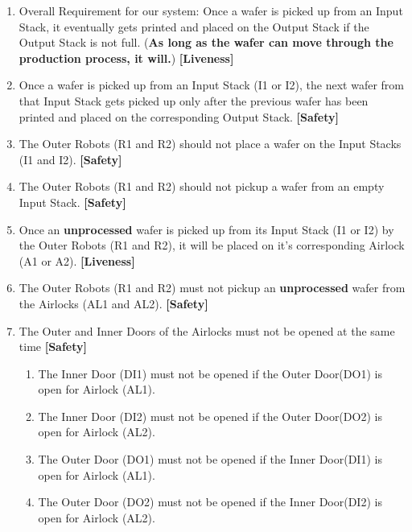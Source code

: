 \documentclass[a4paper,12pt]{article}
\begin{document}
	\begin{enumerate}
		\item Overall Requirement for our system: Once a wafer is picked up from an Input Stack, it eventually gets printed and placed on the Output Stack if the Output Stack is not full. (\textbf{As long as the wafer can move through the production process, it will.}) \textbf{[Liveness]}
		\item Once a wafer is picked up from an Input Stack (I1 or I2), the next wafer from that Input Stack gets picked up only after the previous wafer has been printed and placed on the corresponding Output Stack. \textbf{[Safety]}
		\item The Outer Robots (R1 and R2) should not place a wafer on the Input Stacks (I1 and I2). \textbf{[Safety]}
		\item The Outer Robots (R1 and R2) should not pickup a wafer from an empty Input Stack. \textbf{[Safety]}
		\item Once an \textbf{unprocessed} wafer is picked up from its Input Stack (I1 or I2) by the Outer Robots (R1 and R2), it will be placed on it's corresponding Airlock (A1 or A2). \textbf{[Liveness]}
		\item The Outer Robots (R1 and R2) must not pickup an \textbf{unprocessed} wafer from the Airlocks (AL1 and AL2). \textbf{[Safety]}
		\item The Outer and Inner Doors of the Airlocks must not be opened at the same time \textbf{[Safety]}
		\begin{enumerate}
			\item The Inner Door (DI1) must not be opened if the Outer Door(DO1) is open for Airlock (AL1).
			
			\item The Inner Door (DI2) must not be opened if the Outer Door(DO2) is open for Airlock (AL2).
			
			\item The Outer Door (DO1) must not be opened if the Inner Door(DI1) is open for Airlock (AL1).
			
			\item The Outer Door (DO2) must not be opened if the Inner Door(DI2) is open for Airlock (AL2).
			

\end{enumerate}
\end{enumerate}
\end{document}
